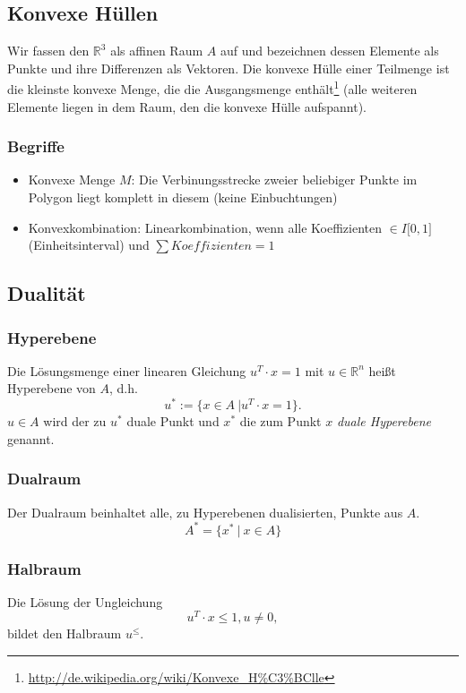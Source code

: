 \subsection{Konvexe Hüllen}

Wir fassen den \(\mathbb{R}^3\) als affinen Raum \(A\) auf und bezeichnen dessen Elemente als Punkte und ihre Differenzen als Vektoren. Die konvexe Hülle einer Teilmenge ist die kleinste konvexe Menge, die die Ausgangsmenge enthält\footnote{\url{http://de.wikipedia.org/wiki/Konvexe_H\%C3\%BClle}} (alle weiteren Elemente liegen in dem Raum, den die konvexe Hülle aufspannt).

\subsubsection{Begriffe}
\begin{itemize}
	\item Konvexe Menge \(M\): Die Verbinungsstrecke zweier beliebiger Punkte im Polygon liegt komplett in diesem (keine Einbuchtungen)
	\item Konvexkombination: Linearkombination, wenn alle Koeffizienten \(\in I\lbrack 0,1\rbrack\) (Einheitsinterval) und \(\sum Koeffizienten = 1\)
\end{itemize}

\subsection{Dualität}

\subsubsection{Hyperebene}
Die Lösungsmenge einer linearen Gleichung \(u^T \cdot x = 1\) mit \(u \in \mathbb{R}^n\) heißt Hyperebene von \(A\), d.h.
\[u^* := \{x \in A~|u^T \cdot x = 1\}.\]
\(u \in A\) wird der zu \(u^*\) duale Punkt und \(x^*\) die zum Punkt \(x\) \textit{duale Hyperebene} genannt.

\subsubsection{Dualraum}
Der Dualraum beinhaltet alle, zu Hyperebenen dualisierten, Punkte aus \(A\).
\[A^* = \{x^*~|~x \in A\}\]

\subsubsection{Halbraum}
Die Lösung der Ungleichung
\[u^T \cdot x \leq 1, u \ne 0,\]
bildet den Halbraum \(u^{\leq}\).

